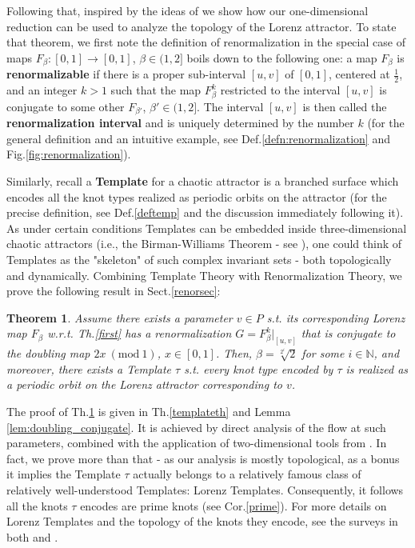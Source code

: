 \documentclass[10pt,reqno]{amsart}
\theoremstyle{plain}
\theoremstyle{assumption}
\theoremstyle{notation}
\theoremstyle{claim}
\theoremstyle{conj}
\theoremstyle{theorem}
\newtheorem{theorem}{Theorem}[section]
\theoremstyle{proposition}
\theoremstyle{corollary}
\newcommand{\Mod}[1]{\ (\mathrm{mod}\ #1)}
\begin{document}
Following that, inspired by the ideas of \cite{GS} we show how our one-dimensional reduction can be used to analyze the topology of the Lorenz attractor. To state that theorem, we first note the definition of renormalization in the special case of maps $F_\beta\colon[0,1]\to[0,1]$, $\beta\in(1,2]$ boils down to the following one: a map $F_{\beta}$ is \textbf{renormalizable} if there is a proper sub-interval $[u, v]$ of $[0,1]$, centered at $\frac{1}{2}$, and an integer $k > 1$ such that the map $F_\beta^k$ restricted to the interval $[u,v]$ is conjugate to some other $F_{\beta'}$, $\beta'\in(1,2]$. The interval $[u, v]$ is then called the \textbf{renormalization interval} and is uniquely determined by the number $k$ (for the general definition and an intuitive example, see Def.\ref{defn:renormalization} and Fig.\ref{fig:renormalization}).

Similarly, recall a \textbf{Template} for a chaotic attractor is a branched surface which encodes all the knot types realized as periodic orbits on the attractor (for the precise definition, see Def.\ref{deftemp} and the discussion immediately following it). As under certain conditions Templates can be embedded inside three-dimensional chaotic attractors (i.e., the Birman-Williams Theorem - see \cite{BW}), one could think of Templates as the "skeleton" of such complex invariant sets - both topologically and dynamically. Combining Template Theory with Renormalization Theory, we prove the following result in Sect.\ref{renorsec}:
\begin{theorem}
    \label{third} Assume there exists a parameter $v\in P$ s.t. its corresponding Lorenz map $F_\beta$ w.r.t. Th.\ref{first} has a renormalization $G=F_\beta^k|_{[u,v]}$ that is conjugate to the doubling map $2x\Mod{1}$, $x\in[0,1]$. Then, $\beta=\sqrt[2^i]{2}$ for some $i\in\mathbb{N}$, and moreover, there exists a Template $\tau$ s.t. every knot type encoded by $\tau$ is realized as a periodic orbit on the Lorenz attractor corresponding to $v$. 
\end{theorem}

The proof of Th.\ref{third} is given in Th.\ref{templateth} and Lemma \ref{lem:doubling_conjugate}. It is achieved by direct analysis of the flow at such parameters, combined with the application of two-dimensional tools from \cite{Han}. In fact, we prove more than that - as our analysis is mostly topological, as a bonus it implies the Template $\tau$ actually belongs to a relatively famous class of relatively well-understood Templates: Lorenz Templates. Consequently, it follows all the knots $\tau$ encodes are prime knots (see Cor.\ref{prime}). For more details on Lorenz Templates and the topology of the knots they encode, see the surveys in both \cite{Pi2} and \cite{Deh}.
\end{document}
